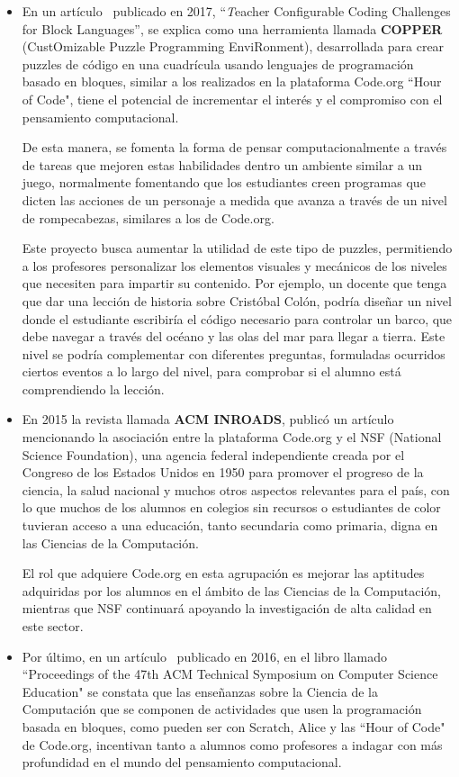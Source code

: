 \begin{itemize}
  \item En un artículo~\cite{Tumlin:2017:TCC:3017680.3022467} publicado en 2017, ``{\textit Teacher Configurable Coding Challenges for Block Languages}'', se explica como una herramienta llamada \textbf{COPPER} (CustOmizable Puzzle Programming EnviRonment), desarrollada para crear puzzles de código en una cuadrícula usando lenguajes de programación basado en bloques, 
  similar a los realizados en la plataforma Code.org ``Hour of Code", tiene el potencial de incrementar el interés y el compromiso con el pensamiento computacional. 
  
  De esta manera, se fomenta la forma de pensar computacionalmente a través de tareas que mejoren estas habilidades dentro un ambiente similar a un juego, normalmente fomentando que los estudiantes creen programas que dicten las acciones de un personaje a medida que avanza a través de un nivel de rompecabezas, similares a los de Code.org.

  Este proyecto busca aumentar la utilidad de este tipo de puzzles, permitiendo a los profesores personalizar los elementos visuales y mecánicos de los niveles que necesiten para impartir su contenido. Por ejemplo, un docente que tenga que dar una lección de historia sobre Cristóbal Colón, podría diseñar un nivel donde el estudiante escribiría el código necesario para controlar un barco, 
  que debe navegar a través del océano y las olas del mar para llegar a tierra. Este nivel se podría complementar con diferentes preguntas, formuladas ocurridos ciertos eventos a lo largo del nivel, para comprobar si el alumno está comprendiendo la lección.
  
  \item En 2015 la revista llamada \textbf{ACM INROADS}, publicó un artículo~\cite{Wilson:2015:HCB:2786608.2746406} mencionando la asociación entre la plataforma Code.org y el NSF (National Science Foundation), una agencia federal independiente creada por el Congreso de los Estados Unidos en 1950 para promover el progreso de la ciencia, la salud nacional y muchos otros aspectos 
  relevantes para el país, con lo que muchos de los alumnos en colegios sin recursos o estudiantes de color tuvieran acceso a una educación, tanto secundaria como primaria, digna en las Ciencias de la Computación.

  El rol que adquiere Code.org en esta agrupación es mejorar las aptitudes adquiridas por los alumnos en el ámbito de las Ciencias de la Computación, mientras que NSF continuará apoyando la investigación de alta calidad en este sector.
  \item Por último, en un artículo~\cite{Brown:2016:PFD:2839509.2844661} publicado en 2016, en el libro llamado ``Proceedings of the 47th ACM Technical Symposium on Computer Science Education" se constata que las enseñanzas sobre la Ciencia de la Computación que se componen de actividades que usen la programación basada en bloques, como pueden ser con Scratch, 
  Alice y las ``Hour of Code" de Code.org, incentivan tanto a alumnos como profesores a indagar con más profundidad en el mundo del pensamiento computacional.

\end{itemize}


